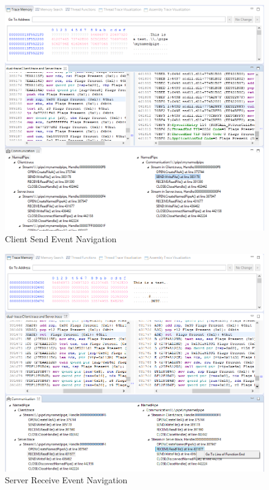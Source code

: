 \begin{figure}[H]
\centerline{\includegraphics[scale=0.4]{Figures/result1_client_send}}
 \caption{Client Send Event Navigation}
\label{result1_client_send}
\end{figure}

\begin{figure}[H]
\centerline{\includegraphics[scale=0.4]{Figures/result1_server_read}}
 \caption{Server Receive Event Navigation}
\label{result1_server_read}
\end{figure}

